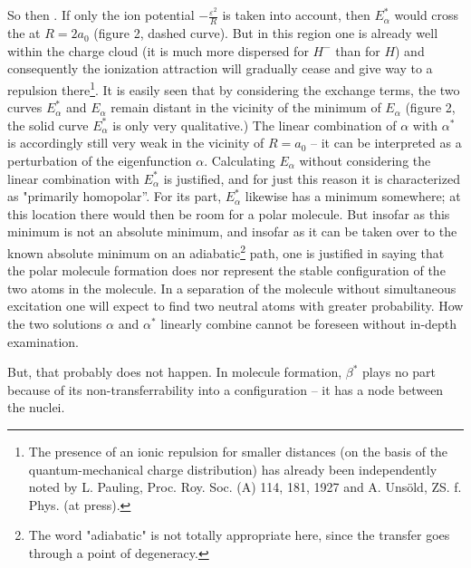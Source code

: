\begin{paper}{1}
\subsection{} So then . If only the ion potential $-\frac{\varepsilon^2}{R}$ is taken into account, then $E_\alpha^*$ would cross the  at $R=2a_0$ (figure 2, dashed curve). But in this region one is already well within the charge cloud (it is much more dispersed for $H^-$ than for $H$) and consequently the ionization attraction will gradually cease and give way to a repulsion there\footnote{The presence of an ionic repulsion for smaller distances (on the basis of the quantum-mechanical charge distribution) has already been independently noted by L. Pauling, Proc. Roy. Soc. (A) 114, 181, 1927 and A. Unsöld, ZS. f. Phys. (at press).}. It is easily seen that by considering the exchange terms, the two curves $E_\alpha^*$ and $E_\alpha$ remain distant in the vicinity of the minimum of $E_\alpha$ (figure 2, the solid curve $E_\alpha^*$ is only very qualitative.) The linear combination of $\alpha$ with $\alpha^*$ is accordingly still very weak in the vicinity of $R=a_0$ -- it can be interpreted as a perturbation of the eigenfunction $\alpha$. Calculating $E_\alpha$ without considering the linear combination with $E_\alpha^*$ is justified, and for just this reason it is characterized as "primarily homopolar”. For its part, $E_\alpha^*$ likewise has a minimum somewhere; at this location there would then be room for a polar molecule. But insofar as this minimum is not an absolute minimum, and insofar as it can be taken over to the known absolute minimum on an adiabatic\footnote{The word "adiabatic" is not totally appropriate here, since the transfer goes through a point of degeneracy.} path, one is justified in saying that the polar molecule formation does nor represent the stable configuration of the two  atoms in the molecule.  In a separation of the molecule without simultaneous excitation one will expect to find two neutral atoms with greater probability. How the two solutions $\alpha$ and $\alpha^*$ linearly combine cannot be foreseen without in-depth examination.

  But, that probably does not happen. In molecule formation, $\beta^*$ plays no part because of its non-transferrability into a  configuration -- it has a node between the nuclei.


\end{paper}
